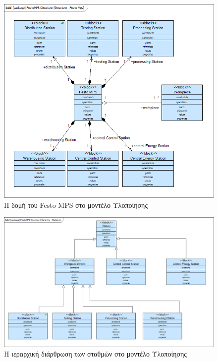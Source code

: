 \documentclass[a4paper,12pt,twoside]{report}
\begin{document}
{\begin{appendices}
				\begin{figure}[hp]
					\centering
					\includegraphics[scale=0.50]{DesignModel_Structure-FestoMps.png}
					\caption{Η δομή του Festo MPS στο μοντέλο Υλοποίησης}
					\label{φωτ:Η δομή του Festo MPS στο μοντέλο Υλοποίησης}
				\end{figure}
				
				\begin{figure}[hp]
					\centering
					\includegraphics[scale=0.30]{DesignModel_Hierarchy-Stations.png}
					\caption{Η ιεραρχική διάρθρωση των σταθμών στο μοντέλο Υλοποίησης}
					\label{φωτ:Η ιεραρχική διάρθρωση των σταθμών στο μοντέλο Υλοποίησης}
				\end{figure}
				

\end{appendices}}
\end{document}
